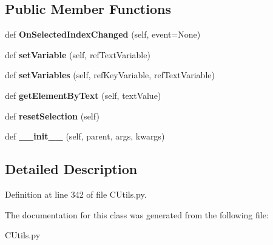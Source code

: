 \subsection*{Public Member Functions}
\begin{DoxyCompactItemize}
\item 
\mbox{\label{class_c_utils_1_1_utils_1_1_u_i_1_1_controls_1_1_drop_down_list_a9d7a16fcda2089f0b7f1142f6bf45acd}} 
def {\bfseries On\+Selected\+Index\+Changed} (self, event=None)
\item 
\mbox{\label{class_c_utils_1_1_utils_1_1_u_i_1_1_controls_1_1_drop_down_list_a5b0816a06a090d1fa84ff907f1b072ba}} 
def {\bfseries set\+Variable} (self, ref\+Text\+Variable)
\item 
\mbox{\label{class_c_utils_1_1_utils_1_1_u_i_1_1_controls_1_1_drop_down_list_aa26b36a4ffc32d15799ee486097fe330}} 
def {\bfseries set\+Variables} (self, ref\+Key\+Variable, ref\+Text\+Variable)
\item 
\mbox{\label{class_c_utils_1_1_utils_1_1_u_i_1_1_controls_1_1_drop_down_list_af77a3768a0873465ab21261595c09d38}} 
def {\bfseries get\+Element\+By\+Text} (self, text\+Value)
\item 
\mbox{\label{class_c_utils_1_1_utils_1_1_u_i_1_1_controls_1_1_drop_down_list_a3ed216411c7b741af5d86d493850f9fb}} 
def {\bfseries reset\+Selection} (self)
\item 
\mbox{\label{class_c_utils_1_1_utils_1_1_u_i_1_1_controls_1_1_drop_down_list_a2d9f1b9bed847ff75b9f232ced637286}} 
def {\bfseries \+\_\+\+\_\+init\+\_\+\+\_\+} (self, parent, args, kwargs)
\end{DoxyCompactItemize}


\subsection{Detailed Description}


Definition at line 342 of file C\+Utils.\+py.



The documentation for this class was generated from the following file\+:\begin{DoxyCompactItemize}
\item 
C\+Utils.\+py\end{DoxyCompactItemize}
